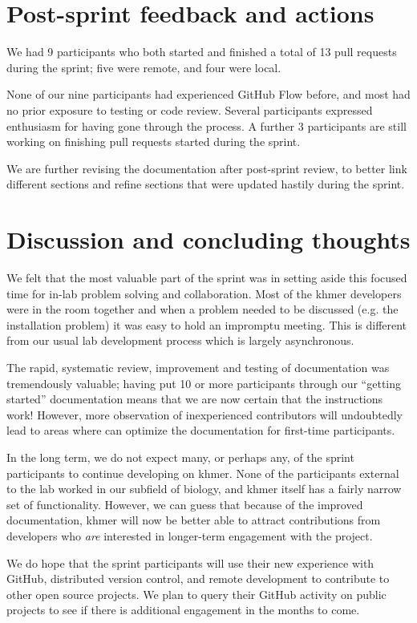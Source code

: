 \documentclass[11pt]{article}
\begin{document}
\section{Post-sprint feedback and actions}

We had 9 participants who both started and finished a total of 13 pull
requests during the sprint; five were remote, and four were
local.

None of our nine participants had experienced GitHub Flow before, and
most had no prior exposure to testing or code review.  Several
participants expressed enthusiasm for having gone through the process.
A further 3 participants are still working on finishing pull requests
started during the sprint.

We are further revising the documentation after post-sprint review, to
better link different sections and refine sections that were updated
hastily during the sprint.

\section{Discussion and concluding thoughts}

We felt that the most valuable part of the sprint was in setting aside
this focused time for in-lab problem solving and collaboration.  Most of
the khmer developers were in the room together and when a problem
needed to be discussed (e.g. the installation problem) it was easy to
hold an impromptu meeting.  This is different from our usual lab
development process which is largely asynchronous.

The rapid, systematic review, improvement and testing of documentation
was tremendously valuable; having put 10 or more participants through
our ``getting started'' documentation means that we are now certain
that the instructions work!  However, more observation of
inexperienced contributors will undoubtedly lead to areas where can
optimize the documentation for first-time participants.

In the long term, we do not expect many, or perhaps any, of the sprint
participants to continue developing on khmer.  None of the
participants external to the lab worked in our subfield of biology,
and khmer itself has a fairly narrow set of functionality.  However,
we can guess that because of the improved documentation, khmer will
now be better able to attract contributions from developers who {\em
  are} interested in longer-term engagement with the project.

We do hope that the sprint participants will use their new experience
with GitHub, distributed version control, and remote development to
contribute to other open source projects.  We plan to query their
GitHub activity on public projects to see if there is additional
engagement in the months to come.
\end{document}
